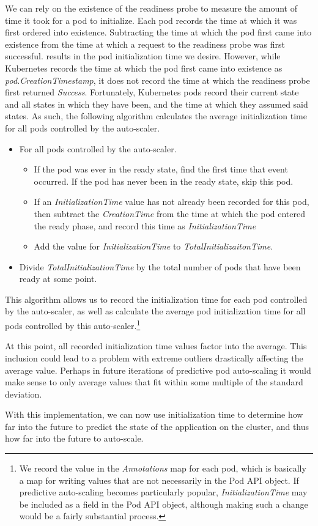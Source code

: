 We can rely on the existence of the readiness probe to
measure the amount of time it took for a pod
to initialize. Each pod records the time at which it was first ordered into
existence. Subtracting the time at which the pod first came into existence
from the time at which a request to the readiness probe was first successful.
results in the pod initialization time we desire. However, while Kubernetes
records the time at which the pod first came into existence as
\textit{pod.CreationTimestamp}, it does not record the time at which the
readiness probe first returned \textit{Success}. Fortunately, Kubernetes pods
record their current state and all states in which they have been, and the time
at which they assumed said states. As such, the following algorithm
calculates the average initialization time for all pods controlled by the auto-scaler.

\begin{itemize}
  \item For all pods controlled by the auto-scaler.
    \begin{itemize}
      \item If the pod was ever in the ready state, find the first time that
        event occurred. If the pod has never been in the ready state, skip this pod.
      \item If an \textit{InitializationTime} value has not already been recorded for
        this pod, then subtract the \textit{CreationTime} from the time at which the
        pod entered the ready phase, and record this time as
        \textit{InitializationTime}
      \item Add the value for \textit{InitializationTime} to
        \textit{TotalInitializaitonTime}.
      \end{itemize}
    \item Divide \textit{TotalInitializationTime} by the total number of pods that
      have been ready at some point.
\end{itemize}

This algorithm allows us to record the initialization time for each pod
controlled by the auto-scaler, as well as calculate the average pod
initialization time for all pods controlled by this auto-scaler.\footnote{We
record the value in the \textit{Annotations} map for each pod,
which is basically a map for writing
values that are not necessarily in the Pod API object. If predictive
auto-scaling becomes particularly popular, \textit{InitializationTime} may be
included as a field in the Pod API object, although making such a change would
be a fairly substantial process.}

At this point, all recorded initialization time values factor into the average.
This inclusion could lead to a problem with extreme outliers drastically
affecting the average value. Perhaps in future iterations of predictive pod
auto-scaling it would make sense to only average values that fit within some
multiple of the standard deviation.

With this implementation, we can now use initialization time to determine how
far into the future to predict the state of the application on the cluster, and
thus how far into the future to auto-scale.

